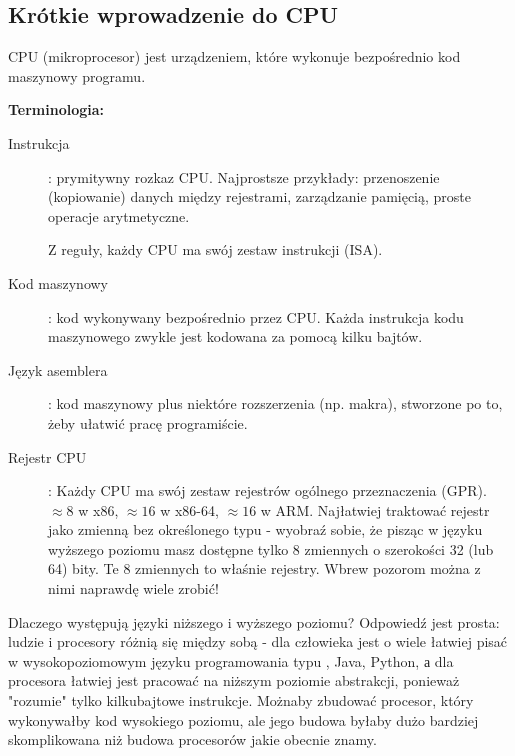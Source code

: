 \subsection{Krótkie wprowadzenie do CPU}

\ac{CPU} (mikroprocesor) jest urządzeniem, które wykonuje bezpośrednio kod maszynowy programu.

\textbf{Terminologia:}

\begin{description}
\item[Instrukcja]: prymitywny rozkaz \ac{CPU}.
Najprostsze przykłady: przenoszenie (kopiowanie) danych między rejestrami, zarządzanie pamięcią, proste operacje arytmetyczne. 

Z reguły, każdy \ac{CPU} ma swój zestaw instrukcji (\ac{ISA}).

\item[Kod maszynowy]: kod wykonywany bezpośrednio przez \ac{CPU}. 
Każda instrukcja kodu maszynowego zwykle jest kodowana za pomocą kilku bajtów.
\item[Język asemblera]: kod maszynowy plus niektóre rozszerzenia (np. makra), stworzone po to, żeby ułatwić pracę programiście.
\item[Rejestr CPU]: Każdy \ac{CPU} ma swój zestaw rejestrów ogólnego przeznaczenia (\ac{GPR}).
$\approx 8$ w x86, $\approx 16$ w x86-64, $\approx 16$ w ARM.
Najłatwiej traktować rejestr jako zmienną bez określonego typu - wyobraź sobie, że pisząc w języku wyższego poziomu masz dostępne tylko 8 zmiennych o szerokości 32 (lub 64) bity. Te 8 zmiennych to właśnie rejestry. Wbrew pozorom można z nimi naprawdę wiele zrobić!
\end{description}

Dlaczego występują języki niższego i wyższego poziomu? Odpowiedź jest prosta: ludzie i procesory różnią się między sobą - dla człowieka jest o wiele łatwiej pisać w wysokopoziomowym języku programowania typu \CCpp, Java, Python, а dla procesora łatwiej jest pracować na niższym poziomie abstrakcji, ponieważ "rozumie" tylko kilkubajtowe instrukcje.
Możnaby zbudować procesor, który wykonywałby kod wysokiego poziomu, ale jego budowa byłaby dużo bardziej skomplikowana niż  budowa procesorów jakie obecnie znamy. 
%
%
%

